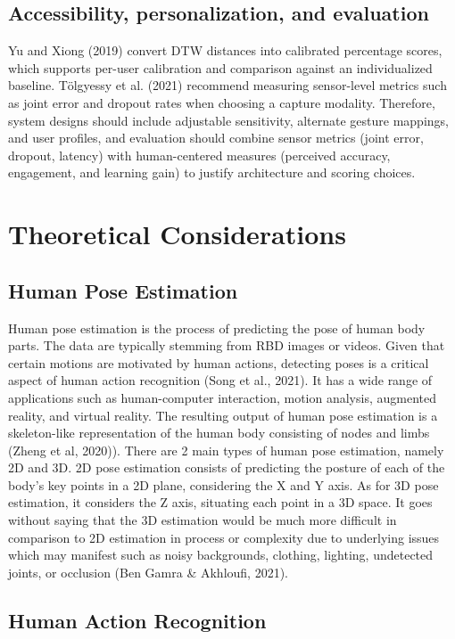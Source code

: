\subsection{Accessibility, personalization, and evaluation}
Yu and Xiong (2019) convert DTW distances into calibrated percentage scores, which supports per-user calibration and comparison against an individualized baseline. Tölgyessy et al. (2021) recommend measuring sensor-level metrics such as joint error and dropout rates when choosing a capture modality. Therefore, system designs should include adjustable sensitivity, alternate gesture mappings, and user profiles, and evaluation should combine sensor metrics (joint error, dropout, latency) with human-centered measures (perceived accuracy, engagement, and learning gain) to justify architecture and scoring choices.

\section{Theoretical Considerations}

\subsection{Human Pose Estimation}

Human pose estimation is the process of predicting the pose of human body parts. The data are typically stemming from RBD images or videos. Given that certain motions are motivated by human actions, detecting poses is a critical aspect of human action recognition (Song et al., 2021). It has a wide range of applications such as human-computer interaction, motion analysis, augmented reality, and virtual reality. The resulting output of human pose estimation is a skeleton-like representation of the human body consisting of nodes and limbs (Zheng et al, 2020)). There are 2 main types of human pose estimation, namely 2D and 3D. 2D pose estimation consists of predicting the posture of each of the body’s key points in a 2D plane, considering the X and Y axis. As for 3D pose estimation, it considers the Z axis, situating each point in a 3D space. It goes without saying that the 3D estimation would be much more difficult in comparison to 2D estimation in process or complexity due to underlying issues which may manifest such as noisy backgrounds, clothing, lighting, undetected joints, or occlusion (Ben Gamra \& Akhloufi, 2021).  


\subsection{Human Action Recognition}

